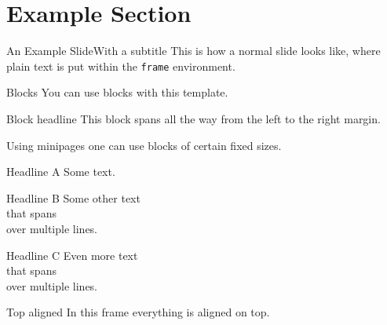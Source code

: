 \section{Example Section}
\begin{frame}[t]{An Example Slide}{With a subtitle}
This is how a normal slide looks like, where plain text is put within the \texttt{frame} environment.
\end{frame}
%
%
%
%
%
\begin{frame}[t]{Blocks}{}
You can use blocks with this template.
\begin{block}{Block headline}
This block spans all the way from the left to the right margin.
\end{block}
Using minipages one can use blocks of certain fixed sizes.\\
%
\noindent%
\begin{minipage}[t]{0.45\textwidth}
\begin{block}{Headline A}
Some text.
\end{block}
\end{minipage}
\hfill%
\begin{minipage}[t]{0.2\textwidth}
\begin{block}{Headline B}
Some other text\\
that spans\\
over multiple lines.
\end{block}
\end{minipage}
\hfill%
\begin{minipage}[t]{0.2\textwidth}
\begin{block}{Headline C}
Even more text\\
that spans\\
over multiple lines.
\end{block}
\end{minipage}
%
\end{frame}
%
%
%
%
%
\begin{frame}[t]{Top aligned}
In this frame everything is aligned on top.
\end{frame}
%
%
%
%
%
